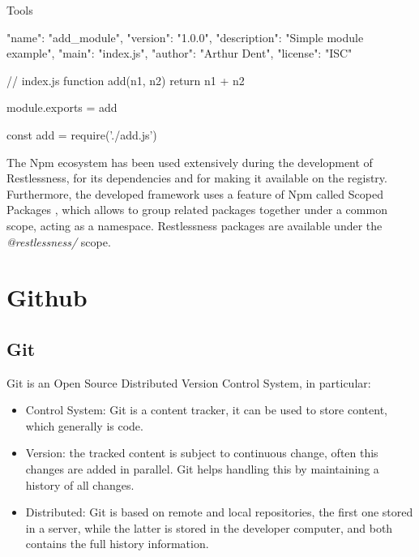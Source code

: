 \begin{chapter}{Tools}
    \bigskip
    \begin{code}[caption=A simple \textit{package.json},
        label={lst:add_module}, language=json]
{
    "name": "add_module",
    "version": "1.0.0",
    "description": "Simple module example",
    "main": "index.js",
    "author": "Arthur Dent",
    "license": "ISC"
}
    \end{code}

    \bigskip
    \begin{code}[caption=CommonJs module definition, label={lst:add_fn}]
// index.js
function add(n1, n2) {
  return n1 + n2
}

module.exports = add
    \end{code}

    \bigskip
    \begin{code}[caption=CommonJs module usage, label={lst:add_require}]
const add = require('./add.js')
    \end{code}

    The Npm ecosystem has been used extensively during the development of Restlessness,
    for its dependencies and for making it available on the registry.
    Furthermore, the developed framework uses a feature of Npm called Scoped Packages
    \cite{npm_scoped_packages}, which allows to group related packages together
    under a common scope, acting as a namespace. Restlessness packages are available
    under the \textit{@restlessness/} scope.

    \section{Github}
    \subsection{Git}
    Git is an Open Source Distributed Version Control System, in particular:
    \begin{itemize}
        \item Control System: Git is a content tracker, it can be used to store
            content, which generally is code.
        \item Version: the tracked content is subject to continuous change, often
            this changes are added in parallel. Git helps handling this by maintaining
            a history of all changes.
        \item Distributed: Git is based on remote and local repositories, the first
            one stored in a server, while the latter is stored in the developer
            computer, and both contains the full history information.
    \end{itemize}


\end{chapter}
